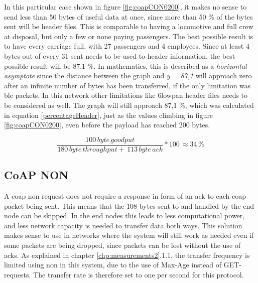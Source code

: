 \noindent In this particular case shown in figure \ref{fig:coapCON0200}, it makes no sense to send less than 50 bytes of useful data at once, since more than 50 \% of the bytes sent will be header files. This is comparable to having a locomotive and full crew at disposal, but only a few or none paying passengers. The best possible result is to have every carriage full, with 27 passengers and 4 employees. Since at least 4 bytes out of every 31 sent needs to be used to header information, the best possible result will be 87,1 \%. In mathematics, this is described as a \textit{horizontal asymptote} since the distance between the graph and \textit{y = 87,1} will approach zero after an infinite number of bytes has been transferred, if the only limitation was \gls{ble} packets. In this network other limitations like \gls{6lowpan} header files needs to be considered as well. The graph will still approach 87,1 \%, which was calculated in equation \ref{percentageHeader}, just as the values climbing in figure \ref{fig:coapCON0200}, even before the \gls{payload} has reached 200 bytes.

\begin{equation} \label{percentage}
    \frac{100 \, byte \, goodput}{180 \, byte \, throughput + \, 113 \, byte \, ack}*100 \, \approx 34 \,\%
\end{equation}



\subsection{CoAP NON}

\noindent A \gls{coap} \gls{non} request does not require a response in form of an \gls{ack} to each \gls{coap} packet being sent. This means that the 108 bytes sent to and handled by the end node can be skipped. In the end nodes this leads to less computational power, and less network capacity is needed to transfer data both ways. This solution makes sense to use in networks where the system will still work as needed even if some packets are being dropped, since packets can be lost without the use of \glspl{ack}. As explained in chapter \ref{chp:measurements2}.1.1, the transfer frequency is limited using \gls{non} in this system, due to the use of Max-Age instead of GET-requests. The transfer rate is therefore set to one per second for this protocol. 


